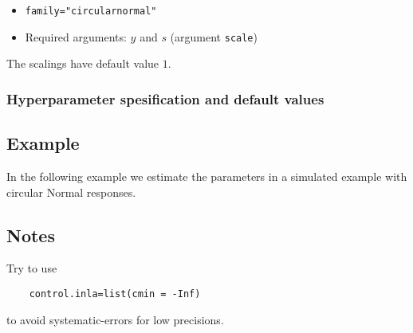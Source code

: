 \documentclass[a4paper,11pt]{article}
\begin{document}
\begin{itemize}
\item \texttt{family="circularnormal"}
\item Required arguments: $y$ and $s$ (argument \texttt{scale})
\end{itemize}
The scalings have default value $1$.

\subsubsection*{Hyperparameter spesification and default values}


\subsection*{Example}

In the following example we estimate the parameters in a simulated
example with circular Normal responses.


\subsection*{Notes}

Try to use
\begin{verbatim}
    control.inla=list(cmin = -Inf)
\end{verbatim}
to avoid systematic-errors for low precisions.
\end{document}
